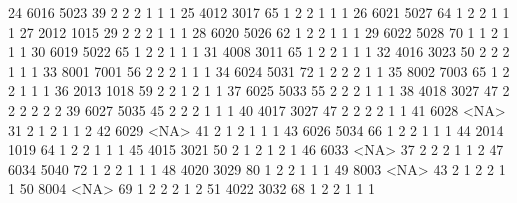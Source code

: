 \documentclass[
  letterpaper,
  DIV=11,
  numbers=noendperiod]{scrreprt}
\newenvironment{Shaded}{\begin{snugshade}}{\end{snugshade}}
\newcommand{\NormalTok}[1]{\textcolor[rgb]{0.00,0.23,0.31}{#1}}
\begin{document}
\begin{Shaded}
\begin{Highlighting}[]
\NormalTok{24  6016 5023  39          2      2        2         1    1                 1}
\NormalTok{25  4012 3017  65          1      2        2         1    1                 1}
\NormalTok{26  6021 5027  64          1      2        2         1    1                 1}
\NormalTok{27  2012 1015  29          2      2        2         1    1                 1}
\NormalTok{28  6020 5026  62          1      2        2         1    1                 1}
\NormalTok{29  6022 5028  70          1      1        2         1    1                 1}
\NormalTok{30  6019 5022  65          1      2        2         1    1                 1}
\NormalTok{31  4008 3011  65          1      2        2         1    1                 1}
\NormalTok{32  4016 3023  50          2      2        2         1    1                 1}
\NormalTok{33  8001 7001  56          2      2        2         1    1                 1}
\NormalTok{34  6024 5031  72          1      2        2         2    1                 1}
\NormalTok{35  8002 7003  65          1      2        2         1    1                 1}
\NormalTok{36  2013 1018  59          2      2        1         2    1                 1}
\NormalTok{37  6025 5033  55          2      2        2         1    1                 1}
\NormalTok{38  4018 3027  47          2      2        2         2    2                 2}
\NormalTok{39  6027 5035  45          2      2        2         1    1                 1}
\NormalTok{40  4017 3027  47          2      2        2         2    1                 1}
\NormalTok{41  6028 \textless{}NA\textgreater{}  31          2      1        2         1    1                 2}
\NormalTok{42  6029 \textless{}NA\textgreater{}  41          2      1        2         1    1                 1}
\NormalTok{43  6026 5034  66          1      2        2         1    1                 1}
\NormalTok{44  2014 1019  64          1      2        2         1    1                 1}
\NormalTok{45  4015 3021  50          2      1        2         1    2                 1}
\NormalTok{46  6033 \textless{}NA\textgreater{}  37          2      2        2         1    1                 2}
\NormalTok{47  6034 5040  72          1      2        2         1    1                 1}
\NormalTok{48  4020 3029  80          1      2        2         1    1                 1}
\NormalTok{49  8003 \textless{}NA\textgreater{}  43          2      1        2         2    1                 1}
\NormalTok{50  8004 \textless{}NA\textgreater{}  69          1      2        2         2    1                 2}
\NormalTok{51  4022 3032  68          1      2        2         1    1                 1}

\end{Highlighting}
\end{Shaded}
\end{document}
